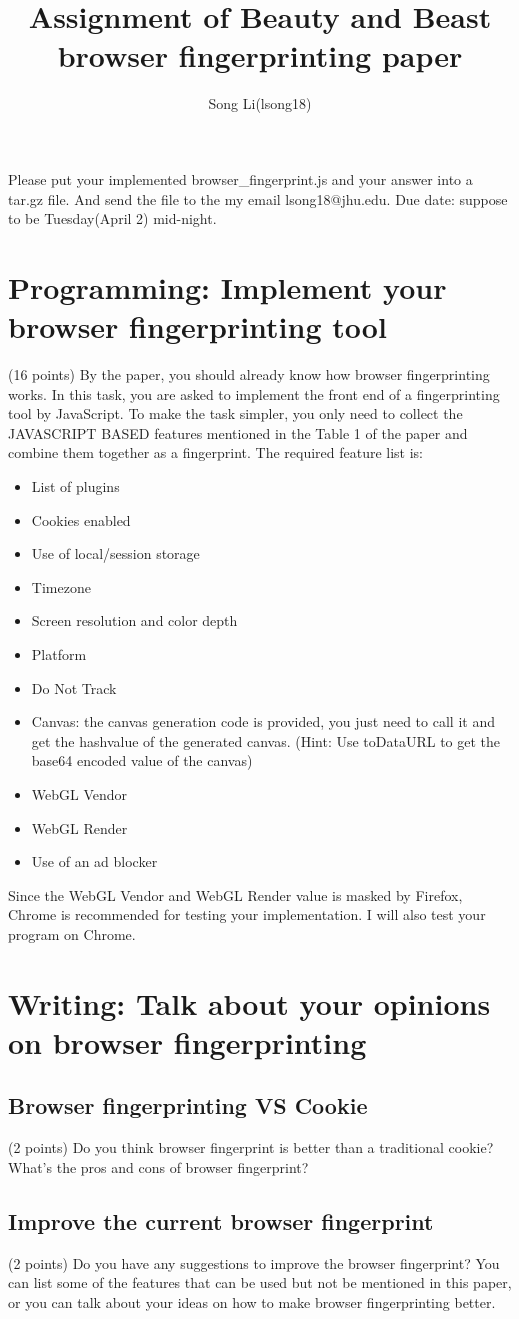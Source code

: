 \documentclass[9pt]{article}
\title{Assignment of Beauty and Beast browser fingerprinting paper}
\author{Song Li(lsong18)}
\begin{document}
	\maketitle
Please put your implemented browser\_fingerprint.js and your answer into a tar.gz file. And send the file to the my email lsong18@jhu.edu. Due date: suppose to be Tuesday(April 2) mid-night. 
	\section{Programming: Implement your browser fingerprinting tool} (16 points)
By the paper, you should already know how browser fingerprinting works. In this task, you are asked to implement the front end of a fingerprinting tool by JavaScript. To make the task simpler, you only need to collect the JAVASCRIPT BASED features mentioned in the Table 1 of the paper and combine them together as a fingerprint.  The required feature list is:
		\begin{itemize}
			\item List of plugins
			\item Cookies enabled
			\item Use of local/session storage
			\item Timezone
			\item Screen resolution and color depth
			\item Platform
			\item Do Not Track
			\item Canvas: the canvas generation code is provided, you just need to call it and get the hashvalue of the generated canvas. (Hint: Use toDataURL to get the base64 encoded value of the canvas)
			\item WebGL Vendor
			\item WebGL Render
			\item Use of an ad blocker
		\end{itemize}
Since the WebGL Vendor and WebGL Render value is masked by Firefox, Chrome is recommended for testing your implementation. I will also test your program on Chrome.
\section{Writing: Talk about your opinions on  browser fingerprinting}
\subsection{Browser fingerprinting VS Cookie} (2 points)
Do you think browser fingerprint is better than a traditional cookie? What's the pros and cons of browser fingerprint?
\subsection{Improve the current browser fingerprint} (2 points)
Do you have any suggestions to improve the browser fingerprint? You can list some of the features that can be used but not be mentioned in this paper, or you can talk about your ideas on how to make browser fingerprinting better. 
\end{document}
